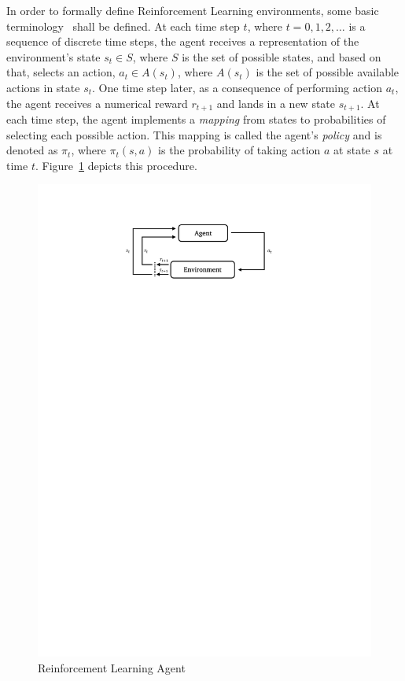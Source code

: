 In order to formally define Reinforcement Learning environments, some basic terminology~\cite{rlIntro} shall be defined. At each time step $t$, where $t = 0,1,2,\dots$ is a sequence of discrete time steps, the agent receives a representation of the environment's state $s_t \in S$, where $S$ is the set of possible states, and based on that, selects an action, $a_t \in A(s_t)$, where $A(s_t)$ is the
set of possible available actions in state $s_t$. One time step later, as a consequence of performing action $a_t$, the agent receives a numerical reward $r_{t+1}$ and lands in a new state $s_{t+1}$. At each time step, the agent implements a \emph{mapping} from states to probabilities of selecting each possible action. This mapping is called the agent's \emph{policy} and is denoted as $\pi_t$, where $\pi_t(s,a)$ is the probability of taking action $a$ at state $s$ at time $t$. Figure~\ref{fig:rl} depicts this procedure.
\begin{figure}[!htbp]
    \centering
    \includegraphics[clip,trim=4cm 23.5cm 4cm 2.5cm]{RL.pdf}
    \caption[Reinforcement Learning Agent]{Reinforcement Learning Agent\footnotemark}
    \label{fig:rl}
\end{figure}


